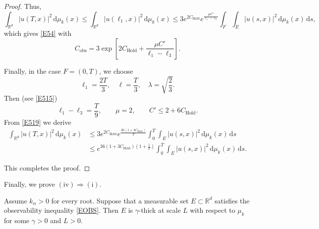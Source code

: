 \documentclass[12pt]{article}
\begin{document}
\begin{proof}
Thus,
\begin{equation}\label{E519}
\int_{\mathbb{R}^d} |u(T,x)|^2\, \mathrm{d}\mu_k(x)
\le \int_{\mathbb{R}^d} |u(\ell_1,x)|^2\, \mathrm{d}\mu_k(x)
\le 3e^{2C_{\mathrm{Hold}}}e^{\frac{\mu C'}{\ell_1-\ell_3}}
\int_{F}\int_{E} |u(s,x)|^2\, \mathrm{d}\mu_k(x)\, \mathrm{d}s,
\end{equation}
which gives \eqref{E54} with
\[
C_{\mathrm{obs}}=3\exp\left[2C_{\mathrm{Hold}}+\frac{\mu C'}{\ell_1-\ell_3}\right].
\]

Finally, in the case $F=(0,T)$, we choose
\[
\ell_1=\frac{2T}{3},\quad \ell=\frac{T}{3},\quad \lambda=\sqrt{\frac{2}{3}}.
\]
Then (see \eqref{E515})
\[
\ell_1-\ell_3=\frac{T}{9},\qquad \mu=2,\qquad C'\le 2+6C_{\mathrm{Hold}}.
\]
From \eqref{E519} we derive
\[
\begin{aligned}
\int_{\mathbb{R}^d}|u(T,x)|^2\, \mathrm{d}\mu_k(x)
&\le 3e^{2C_{\mathrm{Hold}}}e^{\frac{36(1+3C_{\mathrm{Hold}})}{T}}
\int_{0}^{T}\int_{E}|u(s,x)|^2\, \mathrm{d}\mu_k(x)\, \mathrm{d}s \\
&\le e^{36(1+3C_{\mathrm{Hold}})\left(1+\frac{1}{T}\right)}
\int_{0}^{T}\int_{E}|u(s,x)|^2\, \mathrm{d}\mu_k(x)\, \mathrm{d}s.
\end{aligned}
\]

This completes the proof.
\end{proof}


Finally, we prove $(\mathrm{iv}) \Rightarrow (\mathrm{i})$.

\begin{lemma}\label{LFIN}
Assume $k_\alpha>0$ for every root. Suppose that a measurable set $E \subset \mathbb{R}^d$ satisfies the observability inequality \eqref{EOBS}. Then $E$ is $\gamma$-thick at scale $L$ with respect to $\mu_k$ for some $\gamma>0$ and $L>0$.
\end{lemma}
\end{document}
